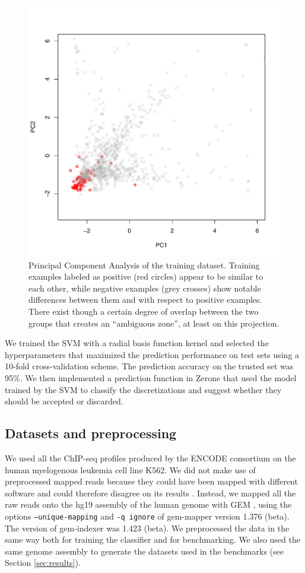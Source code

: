 \documentclass{bioinfo}
\begin{document}
\begin{methods}
\begin{figure}[!tpb]
\centerline{\includegraphics[scale=0.5]{pca_color.pdf}}
\caption{Principal Component Analysis of the training dataset.
Training examples labeled as positive (red circles) appear to be similar to
each other, while negative examples (grey crosses) show notable differences
between them and with respect to positive examples. There exist though a
certain degree of overlap between the two groups that creates an
``ambiguous zone'', at least on this projection.
}\label{fig:pca_color}
\end{figure}

We trained the SVM with a radial basis function kernel and
selected the hyperparameters that maximized the prediction
performance on test sets using a 10-fold cross-validation scheme.
The prediction accuracy on the trusted set was 95\%.
We then implemented a prediction function in Zerone that used the
model trained by the SVM to classify the discretizations and
suggest whether they should be accepted or discarded.

\subsection{Datasets and preprocessing}
We used all the ChIP-seq profiles produced by the ENCODE consortium
on the human myelogenous leukemia cell line K562. We did not make use
of preprocessed mapped reads because they could have been mapped with
different software and could therefore disagree on its results
\citep{pmid21059603}. Instead, we mapped all the raw reads onto the
hg19 assembly of the human genome with GEM \citep{pmid23103880}, using
the options \texttt{--unique-mapping} and \texttt{-q ignore} of gem-mapper
version 1.376 (beta). The version of gem-indexer was 1.423 (beta). We
preprocessed the data in the same way both for training the classifier
and for benchmarking. We also used the same genome assembly to generate
the datasets used in the benchmarks (see Section \ref{sec:results}).


\end{methods}
\end{document}
